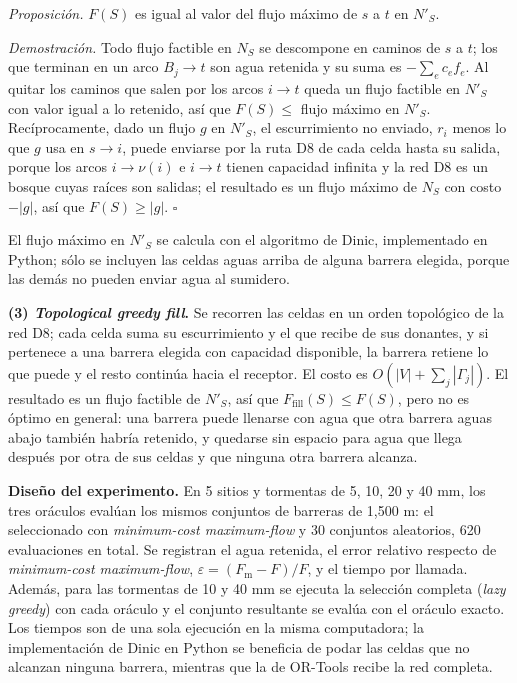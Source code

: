\documentclass[11pt,letterpaper]{article}
\begin{document}
\emph{Proposición.} $F(S)$ es igual al valor del flujo máximo de $s$ a $t$ en $N'_S$.

\emph{Demostración.} Todo flujo factible en $N_S$ se descompone en caminos de $s$ a $t$; los que terminan en un arco $B_j\to t$ son agua retenida y su suma es $-\sum_e c_ef_e$. Al quitar los caminos que salen por los arcos $i\to t$ queda un flujo factible en $N'_S$ con valor igual a lo retenido, así que $F(S)\le$ flujo máximo en $N'_S$. Recíprocamente, dado un flujo $g$ en $N'_S$, el escurrimiento no enviado, $r_i$ menos lo que $g$ usa en $s\to i$, puede enviarse por la ruta D8 de cada celda hasta su salida, porque los arcos $i\to\nu(i)$ e $i\to t$ tienen capacidad infinita y la red D8 es un bosque cuyas raíces son salidas; el resultado es un flujo máximo de $N_S$ con costo $-|g|$, así que $F(S)\ge|g|$. $\square$

El flujo máximo en $N'_S$ se calcula con el algoritmo de Dinic, implementado en Python; sólo se incluyen las celdas aguas arriba de alguna barrera elegida, porque las demás no pueden enviar agua al sumidero.

\textbf{(3) \emph{Topological greedy fill}.} Se recorren las celdas en un orden topológico de la red D8; cada celda suma su escurrimiento y el que recibe de sus donantes, y si pertenece a una barrera elegida con capacidad disponible, la barrera retiene lo que puede y el resto continúa hacia el receptor. El costo es $O(|V|+\sum_j|\Gamma_j|)$. El resultado es un flujo factible de $N'_S$, así que $F_{\text{fill}}(S)\le F(S)$, pero no es óptimo en general: una barrera puede llenarse con agua que otra barrera aguas abajo también habría retenido, y quedarse sin espacio para agua que llega después por otra de sus celdas y que ninguna otra barrera alcanza.

\textbf{Diseño del experimento.} En 5 sitios y tormentas de 5, 10, 20 y 40 mm, los tres oráculos evalúan los mismos conjuntos de barreras de 1,500 m: el seleccionado con \emph{minimum-cost maximum-flow} y 30 conjuntos aleatorios, 620 evaluaciones en total. Se registran el agua retenida, el error relativo respecto de \emph{minimum-cost maximum-flow}, $\varepsilon=(F_{\text{m}}-F)/F$, y el tiempo por llamada. Además, para las tormentas de 10 y 40 mm se ejecuta la selección completa (\emph{lazy greedy}) con cada oráculo y el conjunto resultante se evalúa con el oráculo exacto. Los tiempos son de una sola ejecución en la misma computadora; la implementación de Dinic en Python se beneficia de podar las celdas que no alcanzan ninguna barrera, mientras que la de OR-Tools recibe la red completa.
\end{document}
